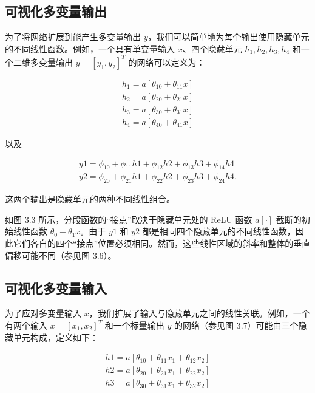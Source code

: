 \subsection{可视化多变量输出}
为了将网络扩展到能产生多变量输出 \(y\)，我们可以简单地为每个输出使用隐藏单元的不同线性函数。例如，一个具有单变量输入 \(x\)、四个隐藏单元 \(h_1, h_2, h_3, h_4\) 和一个二维多变量输出 \(y = [y_1, y_2]^T\) 的网络可以定义为：


\begin{align}
h_1 = a[\theta_{10} + \theta_{11}x] \\
h_2 = a[\theta_{20} + \theta_{21}x] \\
h_3 = a[\theta_{30} + \theta_{31}x] \\
h_4 = a[\theta_{40} + \theta_{41}x] 
\end{align} 

以及

\begin{align}
y1 = \phi_{10} + \phi_{11}h1 + \phi_{12}h2 + \phi_{13}h3 + \phi_{14}h4 \\
y2 = \phi_{20} + \phi_{21}h1 + \phi_{22}h2 + \phi_{23}h3 + \phi_{24}h4.
\end{align} 


这两个输出是隐藏单元的两种不同线性组合。

如图 3.3 所示，分段函数的“接点”取决于隐藏单元处的 ReLU 函数 \(a[\cdot]\) 截断的初始线性函数 \(\theta_0 + \theta_1x\)。由于 \(y1\) 和 \(y2\) 都是相同四个隐藏单元的不同线性函数，因此它们各自的四个“接点”位置必须相同。然而，这些线性区域的斜率和整体的垂直偏移可能不同（参见图 3.6）。



\subsection{可视化多变量输入}

为了应对多变量输入 \(x\)，我们扩展了输入与隐藏单元之间的线性关联。例如，一个有两个输入 \(x = [x_1, x_2]^T\) 和一个标量输出 \(y\) 的网络（参见图 3.7）可能由三个隐藏单元构成，定义如下：


\begin{align}
h1 = a[\theta_{10} + \theta_{11}x_1 + \theta_{12}x_2] \\
h2 = a[\theta_{20} + \theta_{21}x_1 + \theta_{22}x_2] \\
h3 = a[\theta_{30} + \theta_{31}x_1 + \theta_{32}x_2]
\end{align} 



